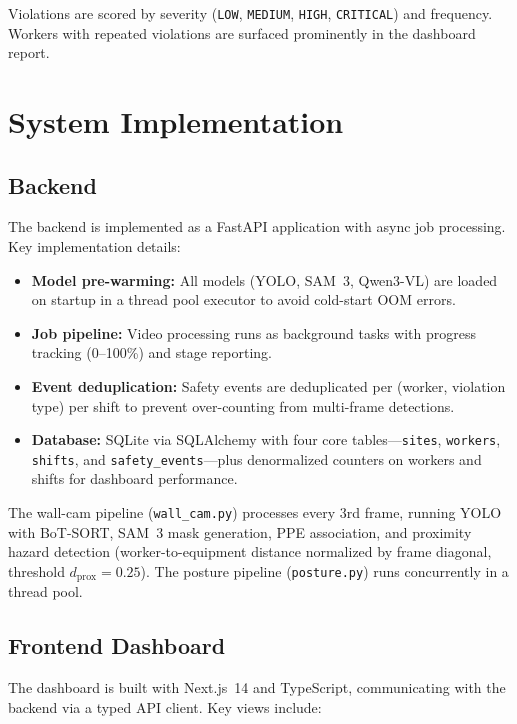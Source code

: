 \documentclass[11pt, twocolumn]{article}
\begin{document}
Violations are scored by severity (\texttt{LOW}, \texttt{MEDIUM}, \texttt{HIGH}, \texttt{CRITICAL}) and frequency. Workers with repeated violations are surfaced prominently in the dashboard report.

\section{System Implementation}

\subsection{Backend}

The backend is implemented as a FastAPI application with async job processing. Key implementation details:

\begin{itemize}[nosep, leftmargin=*]
    \item \textbf{Model pre-warming:} All models (YOLO, SAM~3, Qwen3-VL) are loaded on startup in a thread pool executor to avoid cold-start OOM errors.
    \item \textbf{Job pipeline:} Video processing runs as background tasks with progress tracking (0--100\%) and stage reporting.
    \item \textbf{Event deduplication:} Safety events are deduplicated per (worker, violation type) per shift to prevent over-counting from multi-frame detections.
    \item \textbf{Database:} SQLite via SQLAlchemy with four core tables---\texttt{sites}, \texttt{workers}, \texttt{shifts}, and \texttt{safety\_events}---plus denormalized counters on workers and shifts for dashboard performance.
\end{itemize}

The wall-cam pipeline (\texttt{wall\_cam.py}) processes every 3rd frame, running YOLO with BoT-SORT, SAM~3 mask generation, PPE association, and proximity hazard detection (worker-to-equipment distance normalized by frame diagonal, threshold $d_{\text{prox}} = 0.25$). The posture pipeline (\texttt{posture.py}) runs concurrently in a thread pool.

\subsection{Frontend Dashboard}

The dashboard is built with Next.js~14 and TypeScript, communicating with the backend via a typed API client. Key views include:
\end{document}
